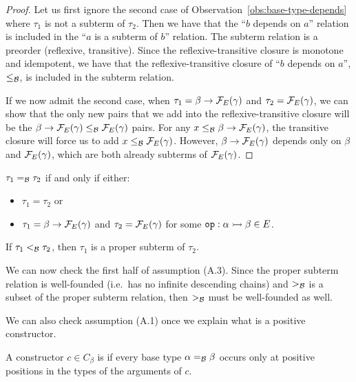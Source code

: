 \begin{proof}
  Let us first ignore the second case of
  Observation~\ref{obs:base-type-depends} where $\tau_1$ is not a subterm
  of $\tau_2$. Then we have that the ``$b$ depends on $a$'' relation is
  included in the ``$a$ is a subterm of $b$'' relation. The subterm
  relation is a preorder (reflexive, transitive). Since the
  reflexive-transitive closure is monotone and idempotent, we have that the
  reflexive-transitive closure of ``$b$ depends on $a$'', $\le_{\mathcal{B}}$, is
  included in the subterm relation.

  If we now admit the second case, when $\tau_1 = \beta \to \mathcal{F}_E(\gamma)$
  and $\tau_2 = \mathcal{F}_E(\gamma)$, we can show that the only new pairs that we
  add into the reflexive-transitive closure will be the
  $\beta \to \mathcal{F}_E(\gamma) \le_{\mathcal{B}} \mathcal{F}_E(\gamma)$ pairs. For any
  $x \le_{\mathcal{B}} \beta \to \mathcal{F}_E(\gamma)$, the transitive closure will force us
  to add $x \le_{\mathcal{B}} \mathcal{F}_E(\gamma)$. However, $\beta \to \mathcal{F}_E(\gamma)$
  depends only on $\beta$ and $\mathcal{F}_E(\gamma)$, which are both already
  subterms of $\mathcal{F}_E(\gamma)$.
\end{proof}

\begin{corollary}\label{cor:base-type-eq}
  $\tau_1 =_{\mathcal{B}} \tau_2$ if and only if either:

  \begin{itemize}
  \item $\tau_1 = \tau_2$ or
  \item $\tau_1 = \beta \to \mathcal{F}_E(\gamma)$ and $\tau_2 = \mathcal{F}_E(\gamma)$ for
    some $\mathtt{op} : \alpha \rightarrowtail \beta \in E$.
  \end{itemize}
\end{corollary}

\begin{corollary}\label{cor:base-type-lt}
  If $\tau_1 <_{\mathcal{B}} \tau_2$, then $\tau_1$ is a proper subterm of $\tau_2$.
\end{corollary}

We can now check the first half of assumption (A.3). Since the proper
subterm relation is well-founded (i.e.\ has no infinite descending chains)
and $>_{\mathcal{B}}$ is a subset of the proper subterm relation, then $>_{\mathcal{B}}$ must
be well-founded as well.

We can also check assumption (A.1) once we explain what is a positive
constructor.

\begin{definition}
  A constructor $c \in C_\beta$ is  if every base type
  $\alpha =_{\mathcal{B}} \beta$ occurs only at positive positions in the types of
  the arguments of $c$.
\end{definition}

